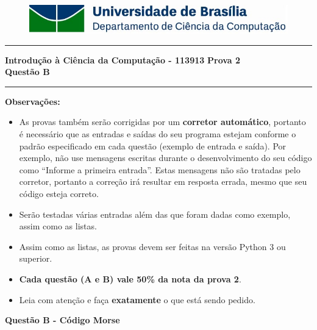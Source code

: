 \documentclass[a4paper, 12pt]{article}
\begin{document}
\begin{figure}[H]
	\includegraphics[scale=0.9]{UnB_CiC_Logo.jpg}
\end{figure}
\noindent\rule{\textwidth}{0.4pt}
\begin{center}
	\textbf{{\Large Introdução à Ciência da Computação - 113913}} \newline \newline
	\textbf{{\large Prova 2} \\
	\vspace{9pt}
	{\large Questão B}} \\
	\noindent\rule{\textwidth}{0.4pt}
	\newline
\end{center}

\textbf{{\large Observações:}}
\begin{itemize}
	\item As provas também serão corrigidas por um \textbf{corretor automático}, portanto é necessário que as entradas e saídas do seu programa estejam conforme o padrão especificado em cada questão (exemplo de entrada e saída). Por exemplo, não use mensagens escritas durante o desenvolvimento do seu código como “Informe a primeira entrada”. Estas mensagens não são tratadas pelo corretor, portanto a correção irá resultar em resposta errada, mesmo que seu código esteja correto.
	\item Serão testadas várias entradas além das que foram dadas como exemplo, assim como as listas.
	\item Assim como as listas, as provas devem ser feitas na versão Python 3 ou superior.
	\item \textbf{Cada questão (A e B) vale 50\% da nota da prova 2}.
	\item Leia com atenção e faça \textbf{exatamente} o que está sendo pedido.
\end{itemize}
\newpage %
\begin{center}
\textbf{{\Large Questão B - Código Morse}}
\end{center}
\vspace{5pt}
\end{document}
